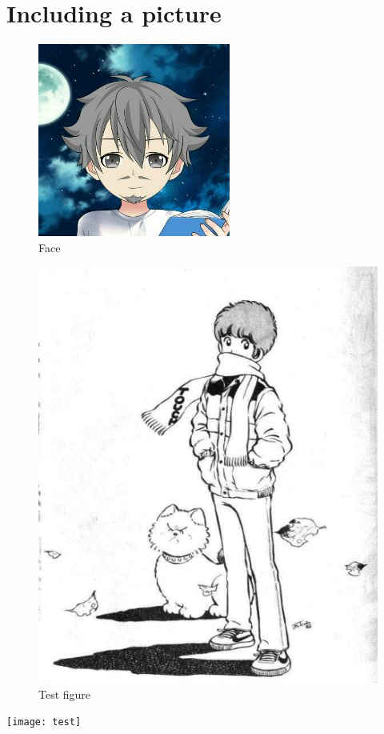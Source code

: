 \message{ !name(picture.tex)}\documentclass[a4paper]{article}
\begin{document}


\section{Including a picture}

\blindtext

\begin{figure}
\centering
\caption{Face}
\includegraphics{face}
\end{figure}

\begin{figure}
\centering

\includegraphics[scale=0.5]{kas}
\caption{Test figure}

\end{figure}

\begin{center}
\begin{minipage}{\linewidth}
\centering
\texttt{[image: test]}
\end{minipage}
\end{center}
\end{document}
